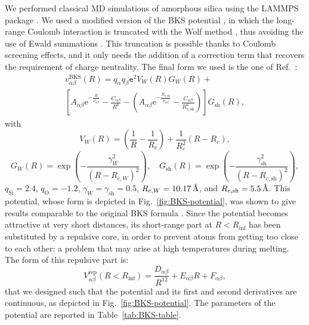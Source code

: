We performed classical MD simulations of amorphous silica using the \textsc{LAMMPS} package \cite{LAMMPS1995}. 
We used a modified version of the BKS potential \cite{Carre2008}, in which the long-range Coulomb interaction is truncated with the Wolf method \cite{Wolf1992,Wolf1999,Fennel2006}, thus avoiding the use of Ewald summations \cite{Allen1989,Frenkel2001}. This truncation is possible thanks to Coulomb screening effects, and it only needs the addition of a correction term that recovers the requirement of charge neutrality. 
The final form we used is the one of Ref.~\cite{Mantisi2012}:
\begin{multline}
    v_{\alpha\beta}^{\mathrm{BKS}}(R) = q_\alpha q_\beta \mathtt{e}^2 V_W(R) G_W(R) + \\
    \left[ A_{\alpha\beta} \mathrm{e}^{-\frac{R}{\rho_{\alpha\beta}}} - \frac{C_{\alpha\beta}}{R^6} - \left( A_{\alpha\beta} \mathrm{e}^{-\frac{R_{c,\mathrm{sh}}}{\rho_{\alpha\beta}}} - \frac{C_{\alpha\beta}}{R_{c,\mathrm{sh}}^6} \right) \right] G_{\mathrm{sh}}(R) , \label{eq:BKS-Wolf}
\end{multline}
with
\begin{equation}
    V_W(R) = \left(\frac{1}{R}-\frac{1}{R_c}\right) + \frac{1}{R_c^2}\left(R-R_c\right) ,
\end{equation}
\begin{equation}
    G_W(R) = \exp \left( -\frac{\gamma_W^2}{(R-R_{c,W})^2} \right) , \quad
    G_{\mathrm{sh}}(R) = \exp \left( -\frac{\gamma_{\mathrm{sh}}^2}{(R-R_{c,\mathrm{sh}})^2} \right) ,
\end{equation}
$q_{\mathrm{Si}}=2.4$, $q_{\mathrm{O}}=-1.2$, $\gamma_W = \gamma_{\mathrm{sh}} = 0.5$, $R_{c,W} = 10.17\,\mathrm{{\mbox{\AA}}}$, and $R_{c,\mathrm{sh}} = 5.5 \,\mathrm{{\mbox{\AA}}}$.
This potential, whose form is depicted in Fig.~\ref{fig:BKS-potential}, was shown to give results comparable to the original BKS formula \cite{Carre2008}. 
Since the potential becomes attractive at very short distances, its short-range part at $R < R_{\mathrm{inf}}$ has been substituted by a repulsive core, in order to prevent atoms from getting too close to each other: a problem that may arise at high temperatures during melting. The form of this repulsive part is:
\begin{equation}
    V_{\alpha\beta}^{\mathrm{rep}}(R < R_{\mathrm{inf}}) = \frac{D_{\alpha\beta}}{R^{12}} + E_{\alpha\beta}R + F_{\alpha\beta}, \label{eq:BKS-repulsive-core}
\end{equation}
that we designed such that the potential and its first and second derivatives are continuous, as depicted in Fig.~\ref{fig:BKS-potential}. The parameters of the potential are reported in Table~\ref{tab:BKS-table}. 


